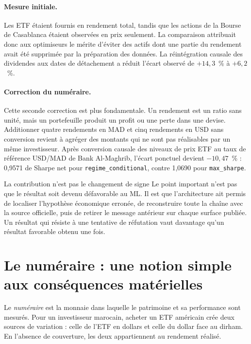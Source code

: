 \paragraph{Mesure initiale.} Les ETF étaient fournis en rendement total, tandis
que les actions de la Bourse de Casablanca étaient observées en prix seulement.
La comparaison attribuait donc aux optimiseurs le mérite d'éviter des actifs
dont une partie du rendement avait été supprimée par la préparation des
données. La réintégration causale des dividendes aux dates de détachement a
réduit l'écart observé de $+14{,}3$~\% à $+6{,}2$~\%.

\paragraph{Correction du numéraire.} Cette seconde correction est plus
fondamentale. Un rendement est un ratio sans unité, mais un portefeuille produit
un profit ou une perte dans une devise. Additionner quatre rendements en MAD et
cinq rendements en USD sans conversion revient à agréger des montants qui ne
sont pas réalisables par un même investisseur. Après conversion causale des
niveaux de prix ETF au taux de référence USD/MAD de Bank Al-Maghrib, l'écart
ponctuel devient $-10{,}47$~\% : 0,9571 de Sharpe net pour
\texttt{regime\_conditional}, contre 1,0690 pour \texttt{max\_sharpe}.

\begin{resultatbox}{La contribution n'est pas le changement de signe}
Le point important n'est pas que le résultat soit devenu défavorable au ML. Il
est que l'architecture ait permis de localiser l'hypothèse économique erronée,
de reconstruire toute la chaîne avec la source officielle, puis de retirer le
message antérieur sur chaque surface publiée. Un résultat qui résiste à une
tentative de réfutation vaut davantage qu'un résultat favorable obtenu une fois.
\end{resultatbox}

\section{Le numéraire : une notion simple aux conséquences matérielles}

Le \emph{numéraire} est la monnaie dans laquelle le patrimoine et sa performance
sont mesurés. Pour un investisseur marocain, acheter un ETF américain crée deux
sources de variation : celle de l'ETF en dollars et celle du dollar face au
dirham. En l'absence de couverture, les deux appartiennent au rendement réalisé.

